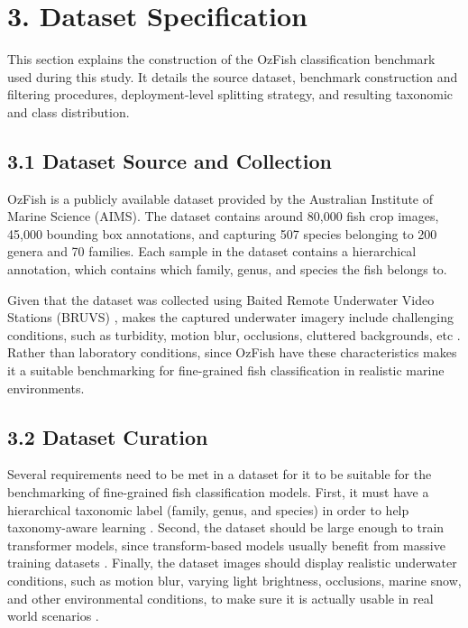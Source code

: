 \documentclass[preprint,12pt]{elsarticle}
\begin{document}
\section*{3. Dataset Specification}\label{dataset-specification}

This section explains the construction of the OzFish classification
benchmark used during this study. It details the source dataset,
benchmark construction and filtering procedures, deployment-level
splitting strategy, and resulting taxonomic and class distribution.

\subsection*{\texorpdfstring{3.1 Dataset Source and Collection
}{3.1 Dataset Source and Collection }}\label{dataset-source-and-collection}

OzFish is a publicly available dataset provided by the Australian
Institute of Marine Science (AIMS)\cite{ref22}.
The dataset contains around 80,000 fish crop images, 45,000 bounding box
annotations, and capturing 507 species belonging to 200 genera and 70
families. Each sample in the dataset contains a hierarchical annotation,
which contains which family, genus, and species the fish belongs to.

Given that the dataset was collected using Baited Remote Underwater
Video Stations (BRUVS) \cite{ref4}, makes the
captured underwater imagery include challenging conditions, such as
turbidity, motion blur, occlusions, cluttered backgrounds, etc
\cite{ref6} \cite{ref9}.
Rather than laboratory conditions, since OzFish have these
characteristics makes it a suitable benchmarking for fine-grained fish
classification in realistic marine environments.

\subsection*{\texorpdfstring{3.2 Dataset Curation
}{3.2 Dataset Curation }}\label{dataset-curation}

Several requirements need to be met in a dataset for it to be suitable
for the benchmarking of fine-grained fish classification models. First,
it must have a hierarchical taxonomic label (family, genus, and species)
in order to help taxonomy-aware learning
\cite{ref23}
\cite{ref24}. Second, the dataset should be
large enough to train transformer models, since transform-based models
usually benefit from massive training datasets
\cite{ref36}
\cite{ref45}. Finally, the dataset images should
display realistic underwater conditions, such as motion blur, varying
light brightness, occlusions, marine snow, and other environmental
conditions, to make sure it is actually usable in real world scenarios
\cite{ref8} \cite{ref9}.
\end{document}
